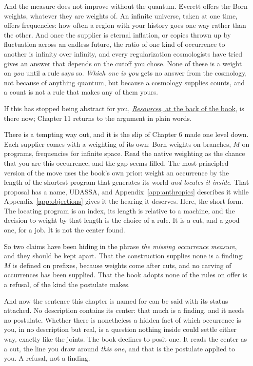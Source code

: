 And the measure does not improve without the quantum. Everett offers the Born weights, whatever they are weights of. An infinite universe, taken at one time, offers frequencies: how often a region with your history goes one way rather than the other. And once the supplier is eternal inflation, or copies thrown up by fluctuation across an endless future, the ratio of one kind of occurrence to another is infinity over infinity, and every regularization cosmologists have tried gives an answer that depends on the cutoff you chose. None of these is a weight on \emph{you} until a rule says so. \emph{Which one is you} gets no answer from the cosmology, not because of anything quantum, but because a cosmology supplies counts, and a count is not a rule that makes any of them yours.

If this has stopped being abstract for you, \hyperref[resources]{\textit{Resources}, at the back of the book}, is there now; Chapter 11 returns to the argument in plain words.

There is a tempting way out, and it is the slip of Chapter 6 made one level down. Each supplier comes with a weighting of its own: Born weights on branches, $M$ on programs, frequencies for infinite space. Read the native weighting as the chance that you are this occurrence, and the gap seems filled. The most principled version of the move uses the book's own prior: weight an occurrence by the length of the shortest program that generates its world \emph{and locates it inside}. That proposal has a name, UDASSA, and Appendix~\ref{app:anthropics} describes it while Appendix~\ref{app:objections} gives it the hearing it deserves. Here, the short form. The locating program is an index, its length is relative to a machine, and the decision to weight by that length is the choice of a rule. It is a cut, and a good one, for a job. It is not the center found.

So two claims have been hiding in the phrase \emph{the missing occurrence measure}, and they should be kept apart. That the construction supplies none is a finding: $M$ is defined on prefixes, because weights come after cuts, and no carving of occurrences has been supplied. That the book adopts none of the rules on offer is a refusal, of the kind the postulate makes.

And now the sentence this chapter is named for can be said with its status attached. No description contains its center: that much is a finding, and it needs no postulate. Whether there is nonetheless a hidden fact of which occurrence is you, in no description but real, is a question nothing inside could settle either way, exactly like the joints. The book declines to posit one. It reads the center as a cut, the line you draw around \emph{this one}, and that is the postulate applied to you. A refusal, not a finding.

